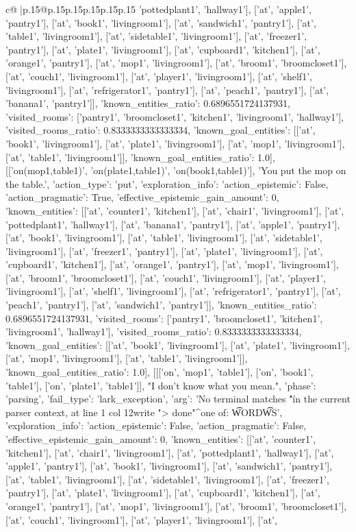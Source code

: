 \documentclass{article}
\begin{document}
{\begin{supertabular}{c@{$\;$}|p{.15\linewidth}@{}p{.15\linewidth}p{.15\linewidth}p{.15\linewidth}p{.15\linewidth}p{.15\linewidth}}
{{{'pottedplant1', 'hallway1'], ['at', 'apple1', 'pantry1'], ['at', 'book1', 'livingroom1'], ['at', 'sandwich1', 'pantry1'], ['at', 'table1', 'livingroom1'], ['at', 'sidetable1', 'livingroom1'], ['at', 'freezer1', 'pantry1'], ['at', 'plate1', 'livingroom1'], ['at', 'cupboard1', 'kitchen1'], ['at', 'orange1', 'pantry1'], ['at', 'mop1', 'livingroom1'], ['at', 'broom1', 'broomcloset1'], ['at', 'couch1', 'livingroom1'], ['at', 'player1', 'livingroom1'], ['at', 'shelf1', 'livingroom1'], ['at', 'refrigerator1', 'pantry1'], ['at', 'peach1', 'pantry1'], ['at', 'banana1', 'pantry1']], 'known_entities_ratio': 0.6896551724137931, 'visited_rooms': ['pantry1', 'broomcloset1', 'kitchen1', 'livingroom1', 'hallway1'], 'visited_rooms_ratio': 0.8333333333333334, 'known_goal_entities': [['at', 'book1', 'livingroom1'], ['at', 'plate1', 'livingroom1'], ['at', 'mop1', 'livingroom1'], ['at', 'table1', 'livingroom1']], 'known_goal_entities_ratio': 1.0}}], [['on(mop1,table1)', 'on(plate1,table1)', 'on(book1,table1)'], 'You put the mop on the table.', {'action_type': 'put', 'exploration_info': {'action_epistemic': False, 'action_pragmatic': True, 'effective_epistemic_gain_amount': 0, 'known_entities': [['at', 'counter1', 'kitchen1'], ['at', 'chair1', 'livingroom1'], ['at', 'pottedplant1', 'hallway1'], ['at', 'banana1', 'pantry1'], ['at', 'apple1', 'pantry1'], ['at', 'book1', 'livingroom1'], ['at', 'table1', 'livingroom1'], ['at', 'sidetable1', 'livingroom1'], ['at', 'freezer1', 'pantry1'], ['at', 'plate1', 'livingroom1'], ['at', 'cupboard1', 'kitchen1'], ['at', 'orange1', 'pantry1'], ['at', 'mop1', 'livingroom1'], ['at', 'broom1', 'broomcloset1'], ['at', 'couch1', 'livingroom1'], ['at', 'player1', 'livingroom1'], ['at', 'shelf1', 'livingroom1'], ['at', 'refrigerator1', 'pantry1'], ['at', 'peach1', 'pantry1'], ['at', 'sandwich1', 'pantry1']], 'known_entities_ratio': 0.6896551724137931, 'visited_rooms': ['pantry1', 'broomcloset1', 'kitchen1', 'livingroom1', 'hallway1'], 'visited_rooms_ratio': 0.8333333333333334, 'known_goal_entities': [['at', 'book1', 'livingroom1'], ['at', 'plate1', 'livingroom1'], ['at', 'mop1', 'livingroom1'], ['at', 'table1', 'livingroom1']], 'known_goal_entities_ratio': 1.0}}], [[['on', 'mop1', 'table1'], ['on', 'book1', 'table1'], ['on', 'plate1', 'table1']], "I don't know what you mean.", {'phase': 'parsing', 'fail_type': 'lark_exception', 'arg': 'No terminal matches \'"\' in the current parser context, at line 1 col 12\n\nthen write "> done"\n           ^\nExpected one of: \n\t* WORD\n\t* WS\n', 'exploration_info': {'action_epistemic': False, 'action_pragmatic': False, 'effective_epistemic_gain_amount': 0, 'known_entities': [['at', 'counter1', 'kitchen1'], ['at', 'chair1', 'livingroom1'], ['at', 'pottedplant1', 'hallway1'], ['at', 'apple1', 'pantry1'], ['at', 'book1', 'livingroom1'], ['at', 'sandwich1', 'pantry1'], ['at', 'table1', 'livingroom1'], ['at', 'sidetable1', 'livingroom1'], ['at', 'freezer1', 'pantry1'], ['at', 'plate1', 'livingroom1'], ['at', 'cupboard1', 'kitchen1'], ['at', 'orange1', 'pantry1'], ['at', 'mop1', 'livingroom1'], ['at', 'broom1', 'broomcloset1'], ['at', 'couch1', 'livingroom1'], ['at', 'player1', 'livingroom1'], ['at', }}}
\end{supertabular}}
\end{document}
